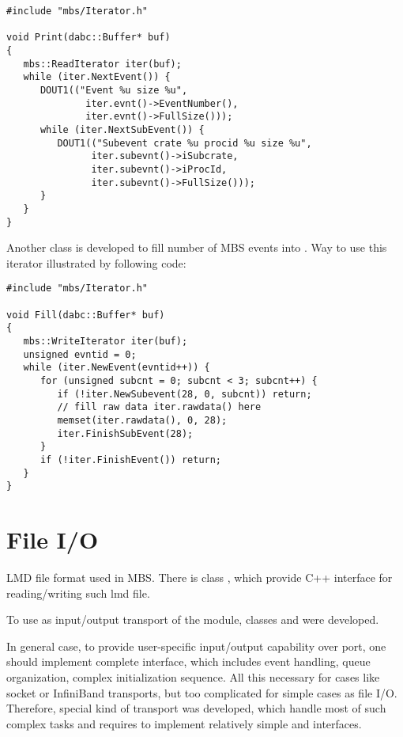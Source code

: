 \begin{verbatim}
#include "mbs/Iterator.h"

void Print(dabc::Buffer* buf)
{
   mbs::ReadIterator iter(buf);
   while (iter.NextEvent()) {
      DOUT1(("Event %u size %u", 
              iter.evnt()->EventNumber(), 
              iter.evnt()->FullSize()));
      while (iter.NextSubEvent()) {
         DOUT1(("Subevent crate %u procid %u size %u",
               iter.subevnt()->iSubcrate, 
               iter.subevnt()->iProcId, 
               iter.subevnt()->FullSize()));
      }
   }
}
\end{verbatim}

Another class  is developed to fill number  
of MBS events into . Way to use this iterator 
illustrated by following code:

\begin{verbatim}
#include "mbs/Iterator.h"

void Fill(dabc::Buffer* buf)
{
   mbs::WriteIterator iter(buf);
   unsigned evntid = 0;
   while (iter.NewEvent(evntid++)) {
      for (unsigned subcnt = 0; subcnt < 3; subcnt++) {
         if (!iter.NewSubevent(28, 0, subcnt)) return;
         // fill raw data iter.rawdata() here
         memset(iter.rawdata(), 0, 28);
         iter.FinishSubEvent(28);
      } 
      if (!iter.FinishEvent()) return;
   }
}
\end{verbatim}


\section{File I/O}

LMD file format used in MBS. There is class , which provide
C++ interface for reading/writing such lmd file.

To use  as input/output transport of the module, classes  
and  were developed. 

In general case, to provide user-specific input/output capability over port, 
one should implement complete  interface, which includes 
event handling, queue organization, complex initialization sequence. 
All this necessary for cases like socket or InfiniBand transports, 
but too complicated for simple cases as file I/O. Therefore, special kind of
transport  was developed, which handle most of such complex tasks
and requires to implement relatively simple  and
 interfaces.

